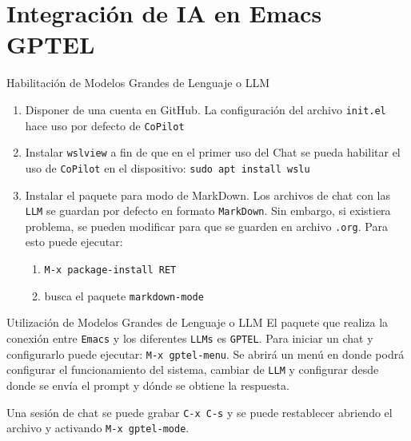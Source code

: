 \documentclass[presentation]{beamer}
\begin{document}
\section{Integración de IA en Emacs GPTEL}
\label{sec:orgd47657e}
\begin{frame}{Habilitación de Modelos Grandes de Lenguaje o LLM}
 \begin{enumerate}
\item Disponer de una cuenta en GitHub. La configuración del archivo
\texttt{init.el} hace uso por defecto de \texttt{CoPilot}
\item Instalar \texttt{wslview} a fin de que en el primer uso del Chat se pueda
habilitar el uso de \texttt{CoPilot} en el dispositivo: \texttt{sudo apt install wslu}
\item Instalar el paquete para modo de MarkDown. Los archivos de chat con
las \texttt{LLM} se guardan por defecto en formato \texttt{MarkDown}. Sin
embargo, si existiera problema, se pueden modificar para que se
guarden en archivo \texttt{.org}. Para esto puede ejecutar:
\begin{enumerate}
\item \texttt{M-x package-install RET}
\item busca el paquete \texttt{markdown-mode}
\end{enumerate}
\end{enumerate}
\end{frame}
\begin{frame}{Utilización de Modelos Grandes de Lenguaje o LLM}
 El paquete que realiza la conexión entre \texttt{Emacs} y los diferentes
\texttt{LLMs} es \texttt{GPTEL}. Para iniciar un chat y configurarlo puede ejecutar:
\texttt{M-x gptel-menu}. Se abrirá un menú en donde podrá configurar el
funcionamiento del sistema, cambiar de \texttt{LLM} y configurar desde donde
se envía el prompt y dónde se obtiene la respuesta.

Una sesión de chat se puede grabar \texttt{C-x C-s} y se puede restablecer
abriendo el archivo y activando \texttt{M-x gptel-mode}.
\end{frame}
\end{document}
